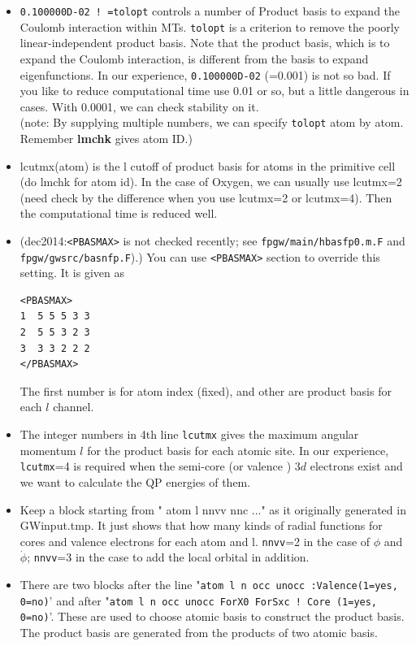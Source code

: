 \documentclass[a4paper,10pt,epsf,fleqn]{article}
\newcommand{\exe}[1]{{\bf #1}\index{#1}}
\newcommand{\io}[1]{{\sf  #1}\index{#1}}
\newcommand{\raw}[1]{{\tt #1}}
\begin{document}
{\begin{itemize}
\item
\verb+0.100000D-02 ! =tolopt+ controls a number of Product basis
to expand the Coulomb interaction within MTs. 
\raw{tolopt} is a criterion to remove the poorly linear-independent product basis.
Note that the product basis, which is to expand the
Coulomb interaction, is different from the basis to expand eigenfunctions.
In our experience, \verb+0.100000D-02+ (=0.001) is not so bad.
If you like to reduce computational time use 0.01 or so, but a little
dangerous in cases. With 0.0001, we can check stability on it.\\
(note: By supplying multiple numbers, we can specify \raw{tolopt} atom by atom.
 Remember \exe{lmchk} gives atom ID.)

\item
     lcutmx(atom) is the l cutoff of product basis for atoms 
     in the primitive cell (do lmchk for atom id).
     In the case of Oxygen, we can usually use lcutmx=2 (need check by
     the difference when you use lcutmx=2 or lcutmx=4). 
     Then the computational time is reduced well.

\item
(dec2014:\verb#<PBASMAX># is not checked recently;
see \verb#fpgw/main/hbasfp0.m.F# and \verb#fpgw/gwsrc/basnfp.F#).)
You can use \verb#<PBASMAX># section to override this setting. It is given as
\begin{verbatim}
<PBASMAX>
1  5 5 5 3 3
2  5 5 3 2 3
3  3 3 2 2 2
</PBASMAX>
\end{verbatim}
The first number is for atom index (fixed), and other are product basis 
for each $l$ channel.


\item
The integer numbers in 4th line \raw{lcutmx}
gives the maximum angular momentum $l$ for the product basis
for each atomic site.
In our experience, \raw{lcutmx}=4 is required
when the semi-core (or valence ) $3d$ electrons exist
and we want to calculate the QP energies of them.

\item
Keep a block starting from 
"  atom   l  nnvv  nnc ..."  as it originally generated 
in \io{GWinput.tmp}. It just shows that how many kinds of radial functions
for cores and valence electrons for each atom and l.
{\tt nnvv}=2 in the case of $\phi$ and $\dot{\phi}$;
{\tt nnvv}=3 in the case to add the local orbital in addition.

\item
There are two blocks after the line
"{\tt   atom   l    n  occ  unocc  :Valence(1=yes, 0=no)}'
and after
"{\tt   atom   l    n  occ unocc  ForX0 ForSxc ! Core (1=yes, 0=no)}'.
These are used to choose atomic basis to construct the product basis.
The product basis are generated from the products of two atomic basis.


\end{itemize}}
\end{document}
